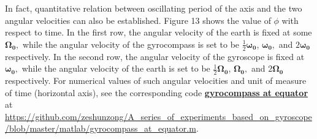 \documentclass[12pt]{article}
\renewcommand{\(}{\left (}
\renewcommand{\)}{\right )}
\renewcommand{\vec}[1]{\boldsymbol{#1}}
\begin{document}
In fact, quantitative relation between oscillating period of the axis and the two angular velocities can also be established. Figure 13 shows the value of $\phi$ with respect to time. In the first row, the angular velocity of the earth is fixed at some $\vec{\Omega_0},$ while the angular velocity of the gyrocompass is set to be $\frac{1}{2}\vec{\omega_0}$, $\vec{\omega_0},$ and $2\vec{\omega_0}$ respectively. In the second row, the angular velocity of the gyroscope is fixed at $\vec{\omega_0},$ while the angular velocity of the earth is set to be $\frac{1}{2}\vec{\Omega_0}$, $\vec{\Omega_0},$ and $2\vec{\Omega_0}$ respectively. For numerical values of such angular velocities and unit of measure of time (horizontal axis), see the corresponding code \href{https://github.com/zeshunzong/A_series_of_experiments_based_on_gyroscope/blob/master/matlab/gyrocompass_at_equator.m}{\textbf{gyrocompass at equator}} at \url{https://github.com/zeshunzong/A_series_of_experiments_based_on_gyroscope/blob/master/matlab/gyrocompass_at_equator.m}.
\end{document}
